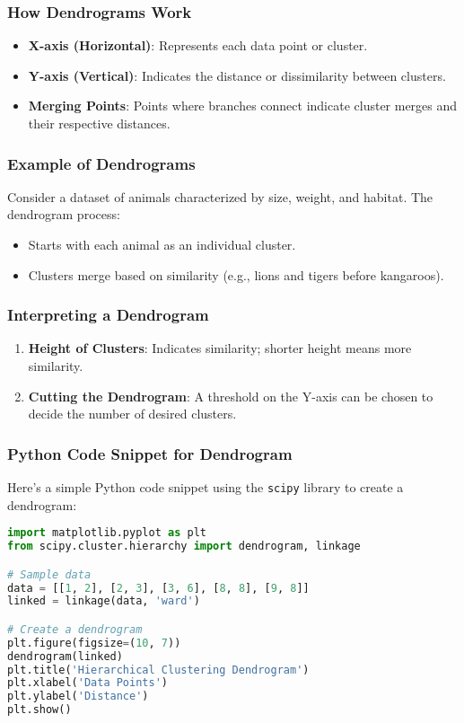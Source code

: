 \documentclass[aspectratio=169]{beamer}
\begin{document}
\begin{frame}
    \frametitle{How Dendrograms Work}
    \begin{itemize}
        \item \textbf{X-axis (Horizontal)}: Represents each data point or cluster.
        \item \textbf{Y-axis (Vertical)}: Indicates the distance or dissimilarity between clusters.
        \item \textbf{Merging Points}: Points where branches connect indicate cluster merges and their respective distances.
    \end{itemize}
\end{frame}

\begin{frame}
    \frametitle{Example of Dendrograms}
    Consider a dataset of animals characterized by size, weight, and habitat. The dendrogram process:
    \begin{itemize}
        \item Starts with each animal as an individual cluster.
        \item Clusters merge based on similarity (e.g., lions and tigers before kangaroos).
    \end{itemize}
\end{frame}

\begin{frame}
    \frametitle{Interpreting a Dendrogram}
    \begin{enumerate}
        \item \textbf{Height of Clusters}: Indicates similarity; shorter height means more similarity.
        \item \textbf{Cutting the Dendrogram}: A threshold on the Y-axis can be chosen to decide the number of desired clusters.
    \end{enumerate}
\end{frame}

\begin{frame}[fragile]
    \frametitle{Python Code Snippet for Dendrogram}
    Here’s a simple Python code snippet using the \texttt{scipy} library to create a dendrogram:
    
    \begin{lstlisting}[language=Python]
import matplotlib.pyplot as plt
from scipy.cluster.hierarchy import dendrogram, linkage

# Sample data
data = [[1, 2], [2, 3], [3, 6], [8, 8], [9, 8]]
linked = linkage(data, 'ward')

# Create a dendrogram
plt.figure(figsize=(10, 7))
dendrogram(linked)
plt.title('Hierarchical Clustering Dendrogram')
plt.xlabel('Data Points')
plt.ylabel('Distance')
plt.show()
    \end{lstlisting}
\end{frame}
\end{document}

